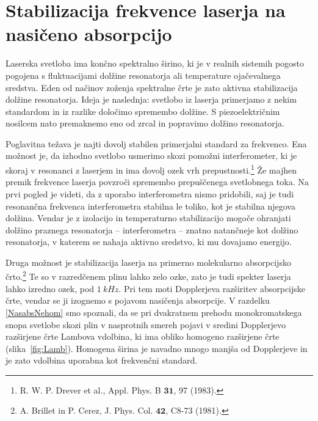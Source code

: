 \section{Stabilizacija frekvence laserja na nasičeno absorpcijo}
\label{chap:stabilizacija}
Laserska svetloba ima končno spektralno širino, ki 
je v realnih sistemih pogosto pogojena s fluktuacijami dolžine resonatorja ali 
temperature ojačevalnega sredstva. Eden od načinov 
zoženja spektralne črte je zato aktivna stabilizacija
dolžine resonatorja. Ideja je naslednja: svetlobo iz laserja primerjamo
z nekim standardom in iz razlike določimo spremembo dolžine. S
piezoelektričnim nosilcem nato premaknemo eno od zrcal in popravimo 
dolžino resonatorja. 

Poglavitna težava je najti dovolj stabilen primerjalni standard za frekvenco. 
Ena možnost je, da izhodno svetlobo usmerimo skozi pomožni 
interferometer, 
ki je skoraj v resonanci z laserjem in ima dovolj ozek vrh 
prepustnosti.\footnote{R. W. P. Drever et al., Appl. Phys. B $\mathbf{31}$, 
97 (1983).} Že majhen 
premik frekvence laserja povzroči spremembo prepuščenega svetlobnega toka. 
Na prvi pogled je videti, da z uporabo interferometra nismo pridobili, 
saj je tudi resonančna frekvenca interferometra stabilna le toliko, kot je 
stabilna njegova dolžina. Vendar je z izolacijo in temperaturno stabilizacijo 
mogoče ohranjati dolžino praznega resonatorja -- interferometra -- znatno
natančneje kot dolžino resonatorja, v katerem se nahaja aktivno sredstvo, ki mu 
dovajamo energijo.

Druga možnost je stabilizacija laserja na primerno molekularno absorpcijsko
črto.\footnote{A. Brillet in P. Cerez, J. Phys. Col. $\mathbf{42}$, C8-73 (1981).}
Te so v razredčenem plinu lahko zelo ozke, zato je tudi spekter 
laserja lahko izredno ozek, pod $1~\si{kHz}$. 
Pri tem moti Dopplerjeva razširitev absorpcijske črte, vendar se ji
izognemo s pojavom nasičenja 
absorpcije. V razdelku
\ref{NasabsNehom} smo spoznali, da se pri dvakratnem prehodu
monokromatskega snopa svetlobe skozi plin v nasprotnih smereh pojavi v
sredini Dopplerjevo razširjene črte Lambova vdolbina, ki 
ima obliko homogeno razširjene črte (slika~\ref{fig:Lamb}). 
Homogena širina je navadno mnogo manjša od Dopplerjeve in
je zato vdolbina uporabna kot frekvenčni standard. 

